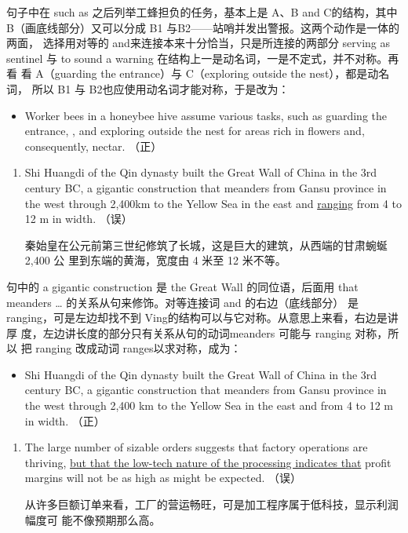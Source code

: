 句子中在 such as 之后列举工蜂担负的任务，基本上是 A、B and C的结构，其中
B（画底线部分）又可以分成 B1 与B2——站哨并发出警报。这两个动作是一体的两面，
选择用对等的 and来连接本来十分恰当，只是所连接的两部分 serving as
sentinel 与 to sound a warning 在结构上一是动名词，一是不定式，并不对称。再看
看 A（guarding the entrance）与 C（exploring outside the nest），都是动名词，
所以 B1 与 B2也应使用动名词才能对称，于是改为：
\begin{mybox}
  \begin{itemize}
  \item Worker bees in a honeybee hive assume various tasks, such as guarding
    the entrance, , and exploring outside the nest for areas rich in
    flowers and, consequently, nectar. （正）
  \end{itemize}
\end{mybox}

\begin{enumerate}[resume]
\item Shi Huangdi of the Qin dynasty built the Great Wall of China in the 3rd
  century BC, a gigantic construction that meanders from Gansu province in
  the west through 2,400km to the Yellow Sea in the east and \ul{ranging}
  from 4 to 12 m in width. （误）

  秦始皇在公元前第三世纪修筑了长城，这是巨大的建筑，从西端的甘肃蜿蜒2,400 公
  里到东端的黄海，宽度由 4 米至 12 米不等。
\end{enumerate}


句中的 a gigantic construction 是 the Great Wall 的同位语，后面用 that
meanders \ldots{} 的关系从句来修饰。对等连接词 and 的右边（底线部分）
是ranging，可是左边却找不到 Ving的结构可以与它对称。从意思上来看，右边是讲厚
度，左边讲长度的部分只有关系从句的动词meanders 可能与 ranging 对称，所以
把 ranging 改成动词 ranges以求对称，成为：
\begin{mybox}
  \begin{itemize}
  \item Shi Huangdi of the Qin dynasty built the Great Wall of China in the 3rd
    century BC, a gigantic construction that meanders from Gansu province in
    the west through 2,400 km to the Yellow Sea in the east and
     from 4 to 12 m in width. （正）
  \end{itemize}
\end{mybox}

\begin{enumerate}[resume]
\item The large number of sizable orders suggests that factory operations are
  thriving, \ul{but that the low-tech nature of the processing indicates
    that} profit margins will not be as high as might be expected. （误）

  从许多巨额订单来看，工厂的营运畅旺，可是加工程序属于低科技，显示利润幅度可
  能不像预期那么高。
\end{enumerate}

